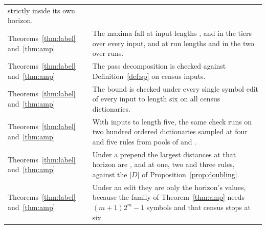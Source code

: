 \documentclass[11pt,a4paper]{article}
\theoremstyle{definition}
\theoremstyle{plain}
\begin{document}
{\begin{longtable}{@{}>{\raggedright\arraybackslash}p{}>{\raggedright\arraybackslash}p{}@{}}
strictly inside its own horizon. \\
\addlinespace
{\footnotesize Theorems~\ref{thm:label} and~\ref{thm:amp}} & The maxima fall at input lengths \AmpFirstOne{},
\AmpFirstTwo{} and \AmpFirstThree{} in the tiers over every input, and at run lengths \AmpRunsFirstThree{} and
\AmpUnaryFirstFour{} in the two over runs. \\
\addlinespace
{\footnotesize Theorems~\ref{thm:label} and~\ref{thm:amp}} & The pass decomposition is checked against
Definition~\ref{def:sp} on \PhaseInputs{} census inputs. \\
\addlinespace
{\footnotesize Theorems~\ref{thm:label} and~\ref{thm:amp}} & The bound is checked under every single symbol edit of
every input to length six on all \CensusTotal{} census dictionaries. \\
\addlinespace
{\footnotesize Theorems~\ref{thm:label} and~\ref{thm:amp}} & With inputs to length five, the same check runs on two
hundred ordered dictionaries sampled at four and five rules from pools of \LabelPoolFour{} and \LabelPoolFive{}. \\
\addlinespace
{\footnotesize Theorems~\ref{thm:label} and~\ref{thm:amp}} & Under a prepend the largest distances at that horizon are
\LabelPrependMaxOne{}, \LabelPrependMaxTwo{} and \LabelPrependMaxThree{} at one, two and three rules, against the
\(|D|\) of Proposition~\ref{prop:doubling}. \\
\addlinespace
{\footnotesize Theorems~\ref{thm:label} and~\ref{thm:amp}} & Under an edit they are only the horizon's values, because
the family of Theorem~\ref{thm:amp} needs \((m+1)2^m - 1\) symbols and that census stops at six. \\
\end{longtable}
}
\end{document}
